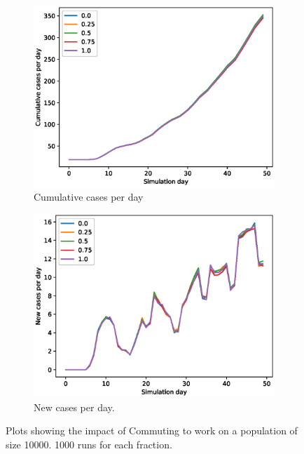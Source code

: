 \documentclass[runningheads]{llncs}
\begin{document}
\begin{figure}[h!]
	\centering
	\begin{subfigure}[b]{0.7\linewidth}
		\includegraphics[width=\textwidth]{work_cum_1.eps}
		\caption{Cumulative cases per day} 
	\end{subfigure}
	\begin{subfigure}[b]{0.7\linewidth}
		\includegraphics[width=\textwidth]{work_cases_per_day_1.eps}
		\caption{New cases per day.} 
	\end{subfigure}
	\caption{Plots showing the impact of Commuting to work on a population of size 10000. 1000 runs for each fraction. }
	\label{CommutingPlot1}
\end{figure}
\end{document}
